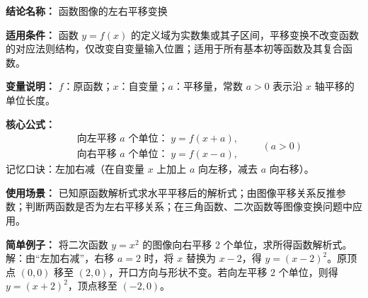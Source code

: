 \textbf{结论名称：} 函数图像的左右平移变换

\textbf{适用条件：} 函数 \(y=f(x)\) 的定义域为实数集或其子区间，平移变换不改变函数的对应法则结构，仅改变自变量输入位置；适用于所有基本初等函数及其复合函数。

\textbf{变量说明：} 
\(f\)：原函数；\(x\)：自变量；\(a\)：平移量，常数 \(a>0\) 表示沿 \(x\) 轴平移的单位长度。

\textbf{核心公式：}
\[
\boxed{
\begin{aligned}
&\text{向左平移 } a \text{ 个单位：} \; y = f(x+a),\\
&\text{向右平移 } a \text{ 个单位：} \; y = f(x-a),
\end{aligned}
\qquad (a>0)
}
\]
记忆口诀：左加右减（在自变量 \(x\) 上加上 \(a\) 向左移，减去 \(a\) 向右移）。

\textbf{使用场景：} 
已知原函数解析式求水平平移后的解析式；由图像平移关系反推参数；判断两函数是否为左右平移关系；在三角函数、二次函数等图像变换问题中应用。

\textbf{简单例子：} 
将二次函数 \(y=x^2\) 的图像向右平移 \(2\) 个单位，求所得函数解析式。
解：由“左加右减”，右移 \(a=2\) 时，将 \(x\) 替换为 \(x-2\)，得 \(y=(x-2)^2\)。原顶点 \((0,0)\) 移至 \((2,0)\)，开口方向与形状不变。若向左平移 \(2\) 个单位，则得 \(y=(x+2)^2\)，顶点移至 \((-2,0)\)。